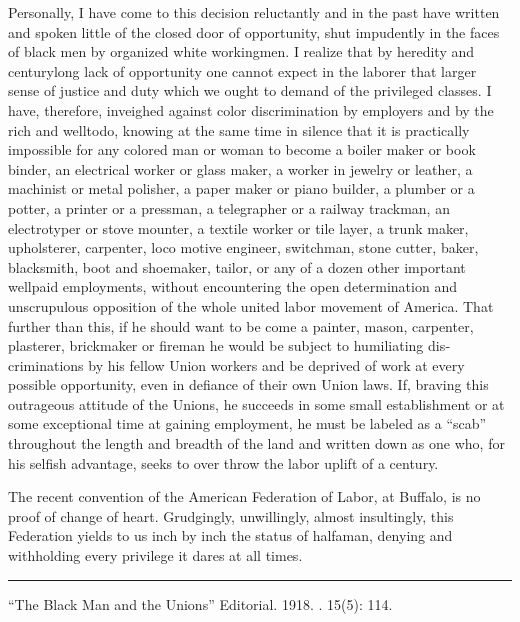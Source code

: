 \documentclass[letterpaper,10pt,english]{jupyterBook}
\begin{document}
\sphinxAtStartPar
Personally, I have come to this decision reluctantly and in the past have written and spoken little of the closed door of opportunity, shut impudently in the faces of black men by organized white workingmen. I realize that by heredity and century\sphinxhyphen{}long lack of opportunity one cannot expect in the laborer that larger sense of justice and duty which we ought to demand of the privileged classes. I have, therefore, inveighed against color discrimination by employers and by the rich and well\sphinxhyphen{}to\sphinxhyphen{}do, knowing at the same time in silence that it is practically impossible for any colored man or woman to become a boiler maker or book binder, an electrical worker or glass maker, a worker in jewelry or leather, a machinist or metal polisher, a paper maker or piano builder, a plumber or a potter, a printer or a pressman, a telegrapher or a railway trackman, an electrotyper or stove mounter, a textile worker or tile layer, a trunk maker, upholsterer, carpenter, loco­ motive engineer, switchman, stone cutter, baker, blacksmith, boot and shoemaker, tailor, or any of a dozen other important well\sphinxhyphen{}paid employments, without encountering the open determination and unscrupulous opposition of the whole united labor movement of America. That further than this, if he should want to be­ come a painter, mason, carpenter, plasterer, brickmaker or fireman he would be subject to humiliating dis­criminations by his fellow Union workers and be deprived of work at every possible opportunity, even in defiance of their own Union laws. If, braving this outrageous attitude of the Unions, he succeeds in some small establishment or at some exceptional time at gaining employment, he must be labeled as a “scab” throughout the length and breadth of the land and written down as one who, for his selfish advantage, seeks to over­ throw the labor uplift of a century.

\sphinxAtStartPar
The recent convention of the American Federation of Labor, at Buffalo, is no proof of change of heart. Grudgingly, unwillingly, almost insultingly, this Federation yields to us inch by inch the status of half\sphinxhyphen{}a\sphinxhyphen{}man, denying and withholding every privilege it dares at all times.


\bigskip\hrule\bigskip


\sphinxAtStartPar
{} “The Black Man and the Unions” Editorial. 1918. . 15(5): 114.
\end{document}
